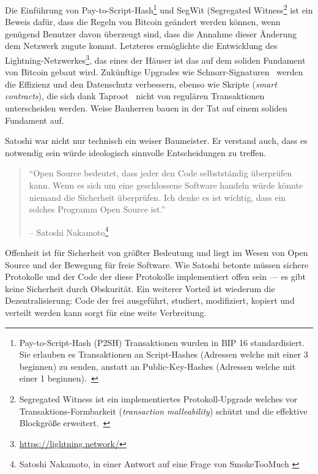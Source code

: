 Die Einführung von Pay-to-Script-Hash\footnote{Pay-to-Script-Hash (P2SH)
Transaktionen wurden in BIP 16 standardisiert. Sie erlauben es Transaktionen an
Script-Hashes (Adressen welche mit einer 3 beginnen) zu senden, anstatt an
Public-Key-Hashes (Adressen welche mit einer 1 beginnen).~\cite{btcwiki:p2sh}}
und SegWit (Segregated Witness\footnote{Segregated Witness  ist ein
implementiertes Protokoll-Upgrade welches vor Transaktions-Formbarkeit
(\textit{transaction malleability}) schützt und die effektive Blockgröße
erweitert.~\cite{btcwiki:segwit}} ist ein Beweis dafür, dass die Regeln von
Bitcoin geändert werden können, wenn genügend Benutzer davon überzeugt sind,
dass die Annahme dieser Änderung dem Netzwerk zugute kommt. Letzteres
ermöglichte die Entwicklung des
Lightning-Netzwerkes\footnote{\url{https://lightning.network/}}, das eines der
Häuser ist das auf dem soliden Fundament von Bitcoin gebaut wird. Zukünftige
Upgrades wie Schnorr-Signaturen~\cite{bip:schnorr} werden die Effizienz und den
Datenschutz verbessern, ebenso wie Skripte (\textit{smart contracts}), die sich
dank Taproot~\cite{taproot} nicht von regulären Transaktionen unterscheiden
werden. Weise Bauherren bauen in der Tat auf einem soliden Fundament auf.

Satoshi war nicht nur technisch ein weiser Baumeister. Er verstand auch, dass es
notwendig sein würde ideologisch sinnvolle Entscheidungen zu treffen.

\begin{quotation}\begin{samepage}
\enquote{Open Source bedeutet, dass jeder den Code selbstständig überprüfen
kann. Wenn es sich um eine geschlossene Software handeln würde könnte niemand
die Sicherheit überprüfen. Ich denke es ist wichtig, dass ein solches Programm
Open Source ist.}
\begin{flushright} -- Satoshi Nakamoto\footnote{Satoshi Nakamoto, in einer
Antwort auf eine Frage von SmokeTooMuch \cite{satoshi-open-source}}
\end{flushright}\end{samepage}\end{quotation}

Offenheit ist für Sicherheit von größter Bedeutung und liegt im Wesen von Open
Source und der Bewegung für freie Software. Wie Satoshi betonte müssen sichere
Protokolle und der Code der diese Protokolle implementiert offen sein --- es
gibt keine Sicherheit durch Obskurität. Ein weiterer Vorteil ist wiederum die
Dezentralisierung: Code der frei ausgeführt, studiert, modifiziert, kopiert und
verteilt werden kann sorgt für eine weite Verbreitung.


